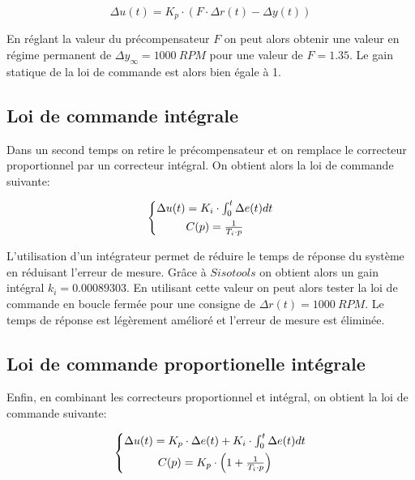 \documentclass[12pt]{report}
\begin{document}
\vspace{0.2cm}
\begin{equation}
  \Delta u(t) = K_p \cdot (F \cdot \Delta r(t) - \Delta y(t))
\end{equation}
\vspace{0.2cm}

En réglant la valeur du précompensateur $F$ on peut alors obtenir une valeur en régime
permanent de $\Delta y_{\infty} = 1000 ~ RPM$ pour une valeur de $F = 1.35$. Le gain
statique de la loi de commande est alors bien égale à 1.

\newpage

\subsection{Loi de commande intégrale}

Dans un second temps on retire le précompensateur et on remplace le correcteur proportionnel par un correcteur intégral.
On obtient alors la loi de commande suivante: 

\vspace{0.2cm}
\begin{equation}
  \left\{
  \begin{matrix}
    \Delta u(t) = K_i \cdot \int_{0}^{t} \Delta e(t) dt \vspace{1ex} \\
    C(p) = \frac{1}{T_i \cdot p}
  \end{matrix}
  \right.
\end{equation}
\vspace{0.2cm}

L'utilisation d'un intégrateur permet de réduire le temps de réponse du système
en réduisant l'erreur de mesure. Grâce à $Sisotools$ on obtient alors un gain intégral
$k_i = 0.00089303$. En utilisant cette valeur on peut alors tester la loi de commande
en boucle fermée pour une consigne de $\Delta r(t) = 1000 ~ RPM$. Le temps de réponse
est légèrement amélioré et l'erreur de mesure est éliminée.

\subsection{Loi de commande proportionelle intégrale}

Enfin, en combinant les correcteurs proportionnel et intégral, on obtient la loi de 
commande suivante:

\begin{equation}
  \left\{
  \begin{matrix}
    \Delta u(t) = K_p \cdot \Delta e(t) + K_i \cdot \int_{0}^{t} \Delta e(t) dt \vspace{1ex} \\
    C(p) = K_p \cdot \left( 1 + \frac{1}{T_i \cdot p} \right)
  \end{matrix}
  \right.
\end{equation}
\vspace{0.2cm}
\end{document}
